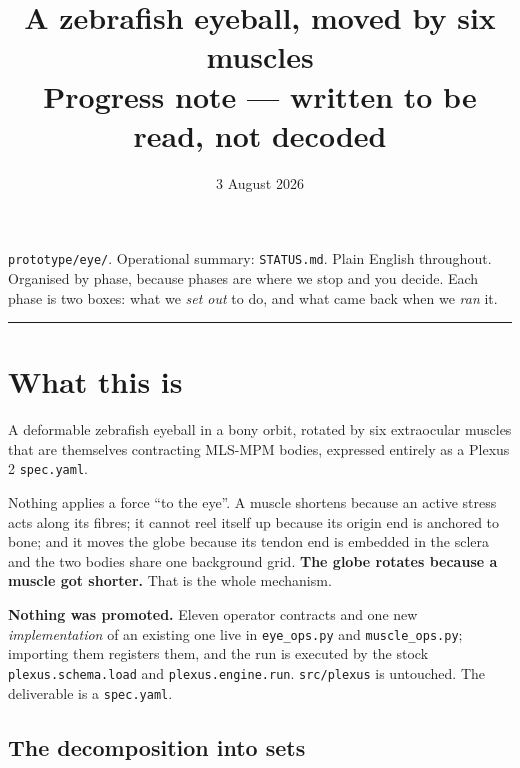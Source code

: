 \documentclass[11pt,a4paper]{article}
\title{\textbf{A zebrafish eyeball, moved by six muscles}\\[6pt]
\large Progress note --- written to be read, not decoded}
\author{}
\date{3 August 2026}
\newcommand{\code}[1]{\texttt{#1}}
\begin{document}
\maketitle
\vspace{-2.2\baselineskip}

\begin{center}\small\color{grey}
\texttt{prototype/eye/}. Operational summary: \texttt{STATUS.md}. Plain English throughout.\\
Organised by phase, because phases are where we stop and you decide. Each phase is two boxes:
what we \emph{set out} to do, and what came back when we \emph{ran} it.
\end{center}

\vspace{4pt}
\hrule
\vspace{10pt}

\section{What this is}

A deformable zebrafish eyeball in a bony orbit, rotated by six extraocular muscles that are
themselves contracting MLS-MPM bodies, expressed entirely as a Plexus\,2 \code{spec.yaml}.

Nothing applies a force ``to the eye''. A muscle shortens because an active stress acts along its
fibres; it cannot reel itself up because its origin end is anchored to bone; and it moves the globe
because its tendon end is embedded in the sclera and the two bodies share one background grid.
\textbf{The globe rotates because a muscle got shorter.} That is the whole mechanism.

\begin{tcolorbox}[colback=grey!6,colframe=grey!45,boxrule=0.7pt,arc=2pt]
\textbf{Nothing was promoted.} Eleven operator contracts and one new \emph{implementation} of an
existing one live in \code{eye\_ops.py} and \code{muscle\_ops.py}; importing them registers them,
and the run is executed by the stock \code{plexus.schema.load} and \code{plexus.engine.run}.
\code{src/plexus} is untouched. The deliverable is a \code{spec.yaml}.
\end{tcolorbox}

\subsection{The decomposition into sets}
\end{document}
